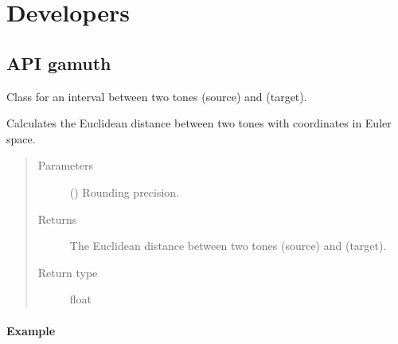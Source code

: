 \documentclass[letterpaper,10pt,english]{sphinxmanual}
\begin{document}
\chapter{Developers}
\label{\detokenize{index:developers}}

\section{API \sphinxhyphen{} gamuth}
\label{\detokenize{api:module-gamuth}}\label{\detokenize{api:api-gamuth}}\label{\detokenize{api:api}}\label{\detokenize{api::doc}}

\begin{fulllineitems}
\sphinxAtStartPar
Class for an interval between two tones  (source) and  (target).


\begin{fulllineitems}
\sphinxAtStartPar
Calculates the Euclidean distance between two tones
with coordinates in Euler space.
\begin{quote}\begin{description}
\item[{Parameters}] \leavevmode
\sphinxAtStartPar
{} () \textendash{} Rounding precision.

\item[{Returns}] \leavevmode
\sphinxAtStartPar
The Euclidean distance between two tones  (source) and  (target).

\item[{Return type}] \leavevmode
\sphinxAtStartPar
float

\end{description}\end{quote}
\subsubsection*{Example}


\end{fulllineitems}
\end{fulllineitems}
\end{document}
